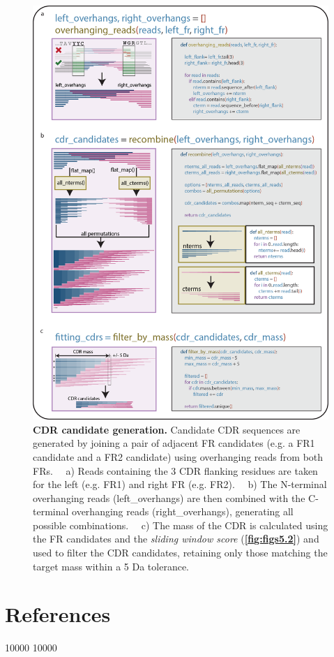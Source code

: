 \begin{subappendices}
  \begin{figure}[!htb]
    \center
    \includegraphics[]{Chapter.5/Figures/fs4.png}
    \caption{\textbf{CDR candidate generation.} Candidate CDR sequences are generated by joining a pair of adjacent FR candidates (e.g. a FR1 candidate and a FR2 candidate) using overhanging reads from both FRs. ~~a) Reads containing the 3 CDR flanking residues are taken for the left (e.g. FR1) and right FR (e.g. FR2). ~~b) The N-terminal overhanging reads (left\_overhangs) are then combined with the C-terminal overhanging reads (right\_overhangs), generating all possible combinations. ~~c) The mass of the CDR is calculated using the FR candidates and the \emph{sliding window score} (\textbf{\autoref{fig:figs5.2}}) and used to filter the CDR candidates, retaining only those matching the target mass within a 5 Da tolerance.}
    \label{fig:figs5.4}
  \end{figure}

\end{subappendices}


\clearpage
\section*{References}

\patchcmd{\thebibliography}
{}
{ 10000  10000}
{}{}

\stopthumb


